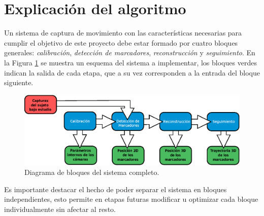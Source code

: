 \section{Explicación del algoritmo}\label{implementacion}

Un sistema de captura de movimiento con las características necesarias para cumplir el objetivo de este proyecto debe estar formado por cuatro bloques generales: \emph{calibración}, \emph{detección de marcadores}, \emph{reconstrucción} y \emph{seguimiento}. En la Figura \ref{bloquesSist} se muestra un esquema del sistema a implementar, los bloques verdes indican la salida de cada etapa, que a su vez corresponden a la entrada del bloque siguiente.

\begin{figure}[ht!]
\centering
\hspace{-0.5cm}
\includegraphics[scale=0.5]{imagenes/Sistema_completo/Diagrama_de_bloques.eps}
\caption{Diagrama de bloques del sistema completo.}
\label{bloquesSist}
\end{figure}

Es importante destacar el hecho de poder separar el sistema en bloques independientes,
esto permite en etapas futuras modificar u optimizar cada bloque individualmente sin afectar al resto.

